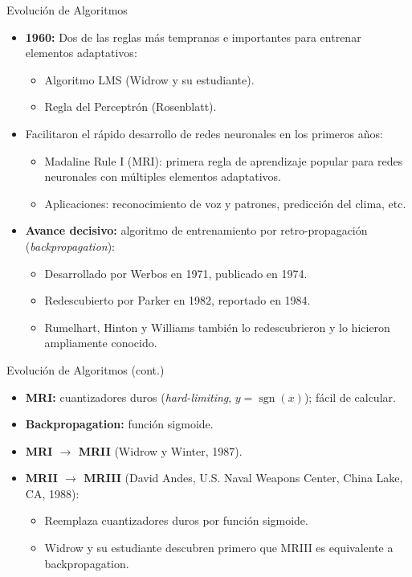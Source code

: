 \documentclass[aspectratio=169,utf8,spanish]{beamer}
\DeclareMathOperator{\sgn}{sgn}
\begin{document}
\begin{frame}{Evolución de Algoritmos}
  \begin{itemize}
    \item \textbf{1960:} Dos de las reglas más tempranas e importantes para entrenar elementos adaptativos:
    \begin{itemize}
      \item Algoritmo LMS (Widrow y su estudiante).
      \item Regla del Perceptrón (Rosenblatt).
    \end{itemize}
    \item Facilitaron el rápido desarrollo de redes neuronales en los primeros años:
    \begin{itemize}
      \item Madaline Rule I (MRI): primera regla de aprendizaje popular para redes neuronales con múltiples elementos adaptativos.
      \item Aplicaciones: reconocimiento de voz y patrones, predicción del clima, etc.
    \end{itemize}
    \item \textbf{Avance decisivo:} algoritmo de entrenamiento por retro-propagación (\textit{backpropagation}):
    \begin{itemize}
      \item Desarrollado por Werbos en 1971, publicado en 1974.
      \item Redescubierto por Parker en 1982, reportado en 1984.
      \item Rumelhart, Hinton y Williams también lo redescubrieron y lo hicieron ampliamente conocido.
    \end{itemize}
  \end{itemize}
\end{frame}

\begin{frame}{Evolución de Algoritmos (cont.)}
  \begin{itemize}
    \item \textbf{MRI:} cuantizadores duros (\textit{hard-limiting}, $y = \sgn(x)$); fácil de calcular.
    \item \textbf{Backpropagation:} función sigmoide.
    \item \textbf{MRI $\to$ MRII} (Widrow y Winter, 1987).
    \item \textbf{MRII $\to$ MRIII} (David Andes, U.S. Naval Weapons Center, China Lake, CA, 1988):
    \begin{itemize}
      \item Reemplaza cuantizadores duros por función sigmoide.
      \item Widrow y su estudiante descubren primero que MRIII es equivalente a backpropagation.
    \end{itemize}
  \end{itemize}
\end{frame}
\end{document}
